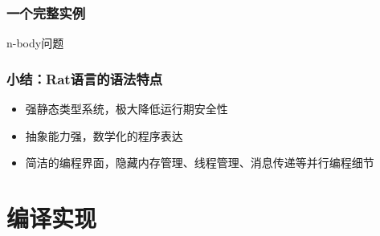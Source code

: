 \documentclass{beamer}
\begin{document}
\begin{frame}[t]
\end{frame}

\begin{frame}
  \frametitle{一个完整实例}
  n-body问题
  
\end{frame}

\begin{frame}
  \frametitle{小结：Rat语言的语法特点}
  \begin{itemize}
    \item 强静态类型系统，极大降低运行期安全性
    \item 抽象能力强，数学化的程序表达
    \item 简洁的编程界面，隐藏内存管理、线程管理、消息传递等并行编程细节
  \end{itemize}
\end{frame}

\section{编译实现}
\frame{\tableofcontents[currentsection]}
\end{document}
